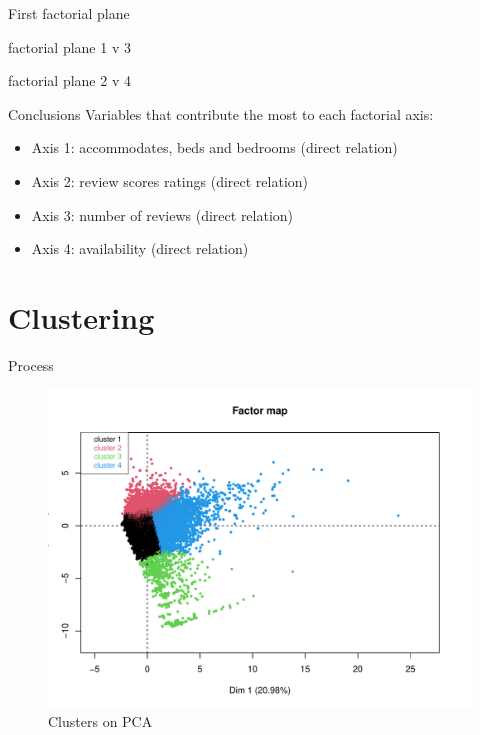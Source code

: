 \begin{frame}{First factorial plane}
\end{frame}

\begin{frame}{factorial plane 1 v 3} %
\end{frame}

\begin{frame}{factorial plane 2 v 4} %
\end{frame}

\begin{frame}{Conclusions}
Variables that contribute the most to each factorial axis:
\begin{itemize}
     \item Axis 1: accommodates, beds and bedrooms (direct relation)
     \item Axis 2: review scores ratings (direct relation)
     \item Axis 3: number of reviews (direct relation)
     \item Axis 4: availability (direct relation)
\end{itemize}
\end{frame}

\section{Clustering}
\begin{frame}{Process}
    \begin{figure}[H]
    \centering
    \includegraphics[width=0.7\linewidth]{factor_map}
    \caption{Clusters on PCA}%
    \label{fig:clusters-pca}
    \end{figure}
\end{frame}

